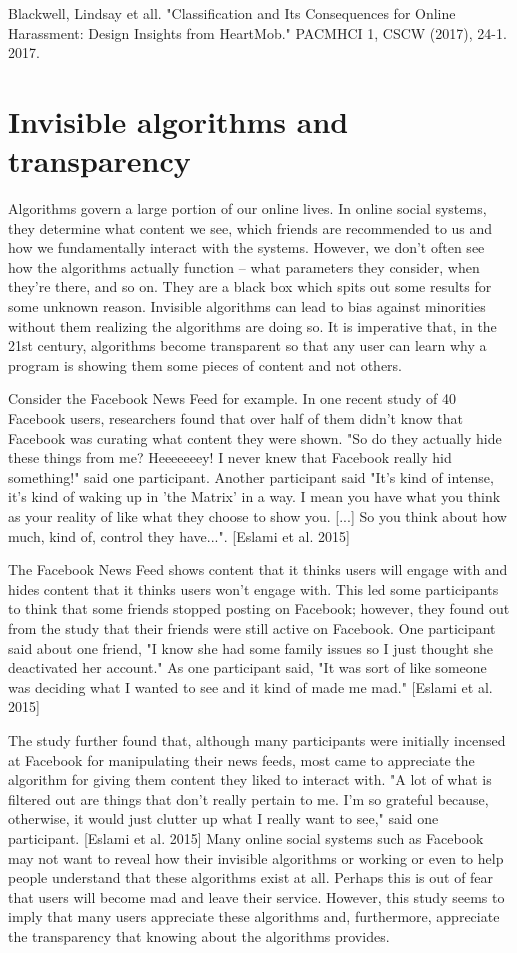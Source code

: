 \documentclass[class=book, crop=false]{standalone}
\begin{document}
Blackwell, Lindsay et all. "Classification and Its Consequences for Online Harassment: Design Insights from HeartMob." PACMHCI 1, CSCW (2017), 24-1. 2017.

\section{Invisible algorithms and transparency}

Algorithms govern a large portion of our online lives. In online social systems, they determine what content we see, which friends are recommended to us and how we fundamentally interact with the systems. However, we don't often see how the algorithms actually function -- what parameters they consider, when they're there, and so on. They are a black box which spits out some results for some unknown reason. Invisible algorithms can lead to bias against minorities without them realizing the algorithms are doing so. It is imperative that, in the 21st century, algorithms become transparent so that any user can learn why a program is showing them some pieces of content and not others.

Consider the Facebook News Feed for example. In one recent study of 40 Facebook users, researchers found that over half of them didn't know that Facebook was curating what content they were shown. "So do they actually hide these things from me? Heeeeeeey! I never knew that Facebook really hid something!" said one participant. Another participant said "It's kind of intense, it's kind of waking up in 'the Matrix' in a way. I mean you have what you think as your reality of like what they choose to show you. [...] So you think about how much, kind of, control they have...". [Eslami et al. 2015]

The Facebook News Feed shows content that it thinks users will engage with and hides content that it thinks users won't engage with. This led some participants to think that some friends stopped posting on Facebook; however, they found out from the study that their friends were still active on Facebook. One participant said about one friend, "I know she had some family issues so I just thought she deactivated her account." As one participant said, "It was sort of like someone was deciding what I wanted to see and it kind of made me mad." [Eslami et al. 2015]

The study further found that, although many participants were initially incensed at Facebook for manipulating their news feeds, most came to appreciate the algorithm for giving them content they liked to interact with. "A lot of what is filtered out are things that don't really pertain to me. I'm so grateful because, otherwise, it would just clutter up what I really want to see," said one participant. [Eslami et al. 2015] Many online social systems such as Facebook may not want to reveal how their invisible algorithms or working or even to help people understand that these algorithms exist at all. Perhaps this is out of fear that users will become mad and leave their service. However, this study seems to imply that many users appreciate these algorithms and, furthermore, appreciate the transparency that knowing about the algorithms provides.
\end{document}
